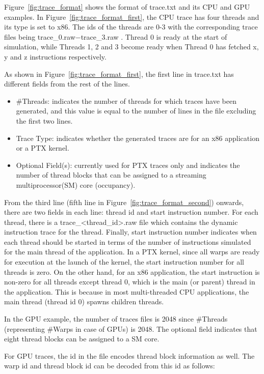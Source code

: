 Figure~\ref{fig:trace_format} shows the format of trace.txt and its CPU and GPU
examples. In Figure~\ref{fig:trace_format_first}, the CPU trace has four threads and its
type is set to x86. The ids of the threads are 0-3 with the corresponding trace
files being trace\_0.raw$-$trace\_3.raw . Thread 0 is ready at the start of
simulation, while Threads 1, 2 and 3 become ready when Thread 0 has fetched x,
y and z instructions respectively.

As shown in Figure~\ref{fig:trace_format_first}, the first line in
trace.txt has different fields from the rest of the lines.

\begin{itemize}\itemsep2pt
\item \#Threads: indicates the number of threads for which traces have
  been generated, and this value is equal to the number of lines in
  the file excluding the first two lines.
\item Trace Type: indicates whether the generated traces are for an
  x86 application or a PTX kernel.
\item Optional Field(s): currently used for PTX traces only and
  indicates the number of thread blocks that can be assigned to a
  streaming multiprocessor(SM) core (occupancy).
\end{itemize}

From the third line (fifth line in Figure~\ref{fig:trace_format_second}) onwards, 
there are two fields in each line:
thread id and start instruction number. For each thread, there is a
trace\_<thread\_id>.raw file which contains the dynamic instruction
trace for the thread. Finally, start instruction number indicates when
each thread should be started in terms of the number of instructions
simulated for the main thread of the application. In a PTX kernel,
since all warps are ready for execution at the launch of the kernel,
the start instruction number for all threads is zero. On the other
hand, for an x86 application, the start instruction is non-zero for all
threads except thread 0, which is the main (or parent) thread in the
application. This is because in most multi-threaded CPU applications,
the main thread (thread id 0) spawns children threads.

In the GPU example, the number of traces files is 2048 since \#Threads
(representing \#Warps in case of GPUs) is 2048.  The optional field indicates
that eight thread blocks can be assigned to a SM core. 

For GPU traces, the id in the file encodes thread block information as
well. The warp id and thread block id can be decoded from this id as follows:

